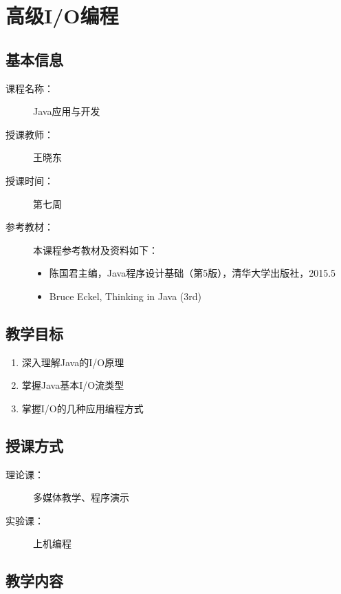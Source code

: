 \chapter{高级I/O编程}
\label{chp:Advanced-IO-programming}

\section*{基本信息}
\sline
\begin{description}
\item[课程名称：] Java应用与开发
\item[授课教师：] 王晓东
\item[授课时间：] 第七周
\item[参考教材：] 本课程参考教材及资料如下：
  \begin{itemize}
  \item 陈国君主编，Java程序设计基础（第5版），清华大学出版社，2015.5
  \item Bruce Eckel, Thinking in Java (3rd)
  \end{itemize}
\end{description}

\section*{教学目标}

\sline

\begin{enumerate}
\item 深入理解Java的I/O原理
\item 掌握Java基本I/O流类型
\item 掌握I/O的几种应用编程方式
\end{enumerate}

\section*{授课方式}

\sline
\begin{description}
\item[理论课：] 多媒体教学、程序演示
\item[实验课：] 上机编程
\end{description}

\newpage
\section*{教学内容}
\sline

